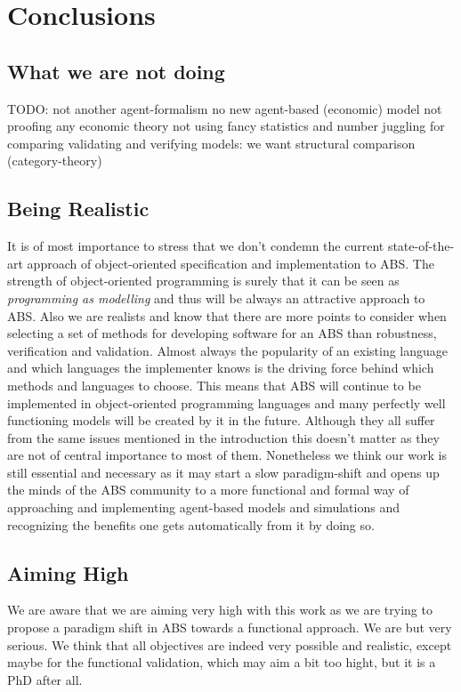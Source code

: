 \chapter{Conclusions}
\label{chap:concl}


\section{What we are not doing}
TODO:
not another agent-formalism
no new agent-based (economic) model
not proofing any economic theory
not using fancy statistics and number juggling for comparing validating and verifying models: we want structural comparison (category-theory)

\section{Being Realistic}
It is of most importance to stress that we don't condemn the current state-of-the-art approach of object-oriented specification and implementation to ABS. The strength of object-oriented programming is surely that it can be seen as \textit{programming as modelling} and thus will be always an attractive approach to ABS. Also we are realists and know that there are more points to consider when selecting a set of methods for developing software for an ABS than robustness, verification and validation. Almost always the popularity of an existing language and which languages the implementer knows is the driving force behind which methods and languages to choose. This means that ABS will continue to be implemented in object-oriented programming languages and many perfectly well functioning models will be created by it in the future. Although they all suffer from the same issues mentioned in the introduction this doesn't matter as they are not of central importance to most of them.
Nonetheless we think our work is still essential and necessary as it may start a slow paradigm-shift and opens up the minds of the ABS community to a more functional and formal way of approaching and implementing agent-based models and simulations and recognizing the benefits one gets automatically from it by doing so.

\section{Aiming High}
We are aware that we are aiming very high with this work as we are trying to propose a paradigm shift in ABS towards a functional approach. We are but very serious. We think that all objectives are indeed very possible and realistic, except maybe for the functional validation, which may aim a bit too hight, but it is a PhD after all. 